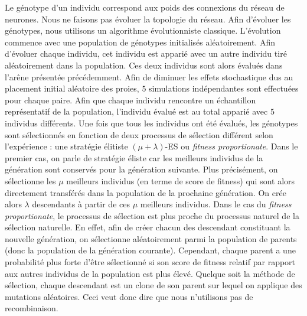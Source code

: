    	Le génotype d'un individu correspond aux poids des connexions du réseau de neurones. Nous ne faisons pas évoluer la topologie du réseau. Afin d'évoluer les génotypes, nous utilisons un algorithme évolutionniste classique. L'évolution commence avec une population de génotypes initialisés aléatoirement. Afin d'évoluer chaque individu, cet individu est apparié avec un autre individu tiré aléatoirement dans la population. Ces deux individus sont alors évalués dans l'arêne présentée précédemment. Afin de diminuer les effets stochastique dus au placement initial aléatoire des proies, $5$ simulations indépendantes sont effectuées pour chaque paire. Afin que chaque individu rencontre un échantillon représentatif de la population, l'individu évalué est au total apparié avec $5$ individus différents. Une fois que tous les individus ont été évalués, les génotypes sont sélectionnés en fonction de deux processus de sélection différent selon l'expérience : une stratégie élitiste \((\mu+\lambda)\)-ES ou \emph{fitness proportionate}. Dans le premier cas, on parle de stratégie éliste car les meilleurs individus de la génération sont conservés pour la génération suivante. Plus précisément, on sélectionne les $\mu$ meilleurs individus (en terme de score de fitness) qui sont alors directement transférés dans la population de la prochaine génération. On crée alors $\lambda$ descendants à partir de ces $\mu$ meilleurs individus. Dans le cas du \emph{fitness proportionate}, le processus de sélection est plus proche du processus naturel de la sélection naturelle. En effet, afin de créer chacun des descendant constituant la nouvelle génération, on sélectionne aléatoirement parmi la population de parents (donc la population de la génération courante). Cependant, chaque parent a une probabilité plus forte d'être sélectionné si son score de fitness relatif par rapport aux autres individus de la population est plus élevé. Quelque soit la méthode de sélection, chaque descendant est un clone de son parent sur lequel on applique des mutations aléatoires. Ceci veut donc dire que nous n'utilisons pas de recombinaison.
